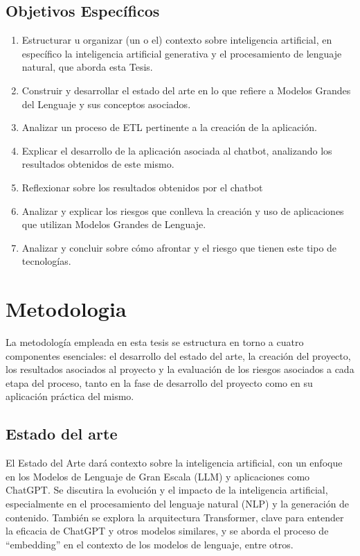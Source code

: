 \subsection{Objetivos Específicos}

\begin{enumerate}
    \item Estructurar u organizar (un o el) contexto sobre inteligencia artificial, en específico la inteligencia artificial generativa y el procesamiento de lenguaje natural, que aborda esta Tesis. 
    \item Construir y desarrollar el estado del arte en lo que refiere a Modelos Grandes del Lenguaje y sus conceptos asociados.
    \item Analizar un proceso de ETL pertinente a la creación de la aplicación.
    \item Explicar el desarrollo de la aplicación asociada al chatbot, analizando los resultados obtenidos de este mismo.
    \item Reflexionar sobre los resultados obtenidos por el chatbot
    \item Analizar y explicar los riesgos que conlleva la creación y uso de aplicaciones que utilizan Modelos Grandes de Lenguaje. 
    \item Analizar y concluir sobre cómo afrontar y el riesgo que tienen este tipo de tecnologías.
\end{enumerate}


\section{Metodologia}

La metodología empleada en esta tesis se estructura en torno a cuatro componentes esenciales: 
el desarrollo del estado del arte, la creación del proyecto, los resultados asociados al proyecto y la evaluación de los riesgos asociados 
a cada etapa del proceso, tanto en la fase de desarrollo del proyecto como en su aplicación práctica del mismo.

\subsection{Estado del arte}
El Estado del Arte dará contexto sobre la inteligencia artificial, con un enfoque en los Modelos de Lenguaje de Gran Escala (LLM) 
y aplicaciones como ChatGPT. Se discutira la evolución y el impacto de la inteligencia artificial, especialmente en el procesamiento 
del lenguaje natural (NLP) y la generación de contenido. También se explora la arquitectura Transformer, clave para entender la 
eficacia de ChatGPT y otros modelos similares, y se aborda el proceso de ``embedding'' en el contexto de los modelos de lenguaje, entre otros.


